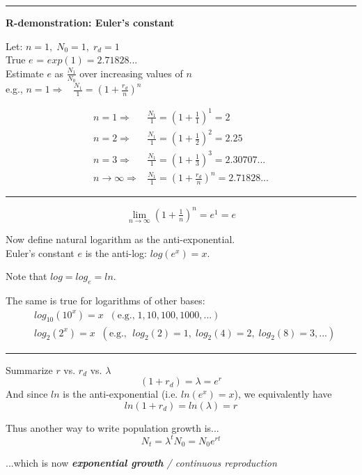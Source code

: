 \documentclass{article}
\begin{document}
\rule[0.5ex]{\linewidth}{1pt}

\textbf{R-demonstration: Euler's constant}

Let: $n=1, \; N_0=1, \; r_d=1$\\
True $e$ = $exp(1) = 2.71828...$\\
Estimate $e$ as $\tfrac{N_1}{N_0}$ over increasing values of $n$\\
\-\hspace{1cm} e.g., $n=1 \Rightarrow  \;\;\; \frac{N_1}{1}=\left(1+\tfrac{r_d}{n}\right)^n $

\begin{align*}
	n=1 \Rightarrow & \frac{N_1}{1}= \left(1+\tfrac{1}{1}\right)^1= 2 \\
	n=2 \Rightarrow & \frac{N_1}{1}= \left(1+\tfrac{1}{2}\right)^2= 2.25 \\
	n=3 \Rightarrow & \frac{N_1}{1}= \left(1+\tfrac{1}{3}\right)^3= 2.30707... \\
	n \to\infty \Rightarrow & \frac{N_1}{1} = \left(1+\tfrac{r_d}{n}\right)^n =  2.71828...
\end{align*}

\rule[0.5ex]{\linewidth}{1pt}

\begin{equation*}
		 \lim_{n \to \infty}\left(1+\tfrac{1}{n}\right)^n	= e^1=e
\end{equation*}

Now define natural logarithm as the anti-exponential.\\
Euler's constant $e$ is the anti-log: $log(e^x)=x$.

Note that $log=log_e=ln$.

The same is true for logarithms of other bases:
\begin{align*}
&	log_{10}(10^x)=x \;\; (\text{e.g.,}\; 1, 10, 100, 1000, ...)\\
&   log_2(2^x)=x \;\; (\text{e.g., }\; log_2(2)=1, \; log_2(4)=2, \; log_2(8)=3, ...)
\end{align*}
\rule[0.5ex]{\linewidth}{1pt}
Summarize $r$ vs. $r_d$ vs. $\lambda$
\begin{equation*}
	(1+r_d)=\lambda=e^r
\end{equation*}
And since $ln$ is the anti-exponential (i.e. $ln(e^x)=x$), we equivalently have
\begin{equation*}
	 ln(1+r_d) = ln(\lambda) = r
\end{equation*}

Thus another way to write population growth is...
\begin{equation*}
	N_t=\lambda^t N_0 = N_0 e^{rt}
\end{equation*}
\begin{center}
...which is now \emph{\textbf{exponential growth} / continuous reproduction}
\end{center}
\end{document}

